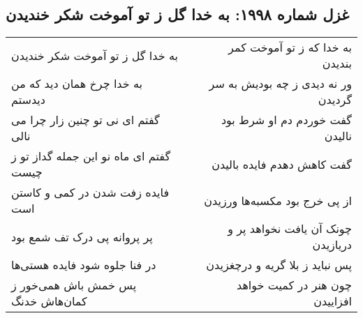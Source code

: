 \begin{center}
\section*{غزل شماره ۱۹۹۸: به خدا گل ز تو آموخت شکر خندیدن}
\label{sec:1998}
\begin{longtable}{l p{0.5cm} r}
به خدا گل ز تو آموخت شکر خندیدن
&&
به خدا که ز تو آموخت کمر بندیدن
\\
به خدا چرخ همان دید که من دیدستم
&&
ور نه دیدی ز چه بودیش به سر گردیدن
\\
گفتم ای نی تو چنین زار چرا می نالی
&&
گفت خوردم دم او شرط بود نالیدن
\\
گفتم ای ماه نو این جمله گداز تو ز چیست
&&
گفت کاهش دهدم فایده بالیدن
\\
فایده زفت شدن در کمی و کاستن است
&&
از پی خرج بود مکسبه‌ها ورزیدن
\\
پر پروانه پی درک تف شمع بود
&&
چونک آن یافت نخواهد پر و دریازیدن
\\
در فنا جلوه شود فایده هستی‌ها
&&
پس نباید ز بلا گریه و درچغزیدن
\\
پس خمش باش همی‌خور ز کمان‌هاش خدنگ
&&
چون هنر در کمیت خواهد افزاییدن
\\
\end{longtable}
\end{center}
